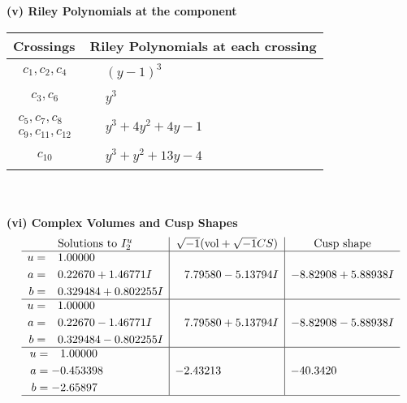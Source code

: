 \documentclass[1p]{elsarticle_modified}
\theoremstyle{definition}
\newcommand{\I}{\sqrt{-1}}
\begin{document}
\flushleft \textbf{(v) Riley Polynomials at the component}\newline \\
\begin{tabular}{m{50pt}|m{274pt}}
Crossings & \hspace{64pt}Riley Polynomials at each crossing \\
\hline $$\begin{aligned}c_{1},c_{2},c_{4}\end{aligned}$$&$\begin{aligned}
&(y-1)^3
\end{aligned}$\\
\hline $$\begin{aligned}c_{3},c_{6}\end{aligned}$$&$\begin{aligned}
&y^3
\end{aligned}$\\
\hline $$\begin{aligned}c_{5},c_{7},c_{8}\\c_{9},c_{11},c_{12}\end{aligned}$$&$\begin{aligned}
&y^3+4 y^2+4 y-1
\end{aligned}$\\
\hline $$\begin{aligned}c_{10}\end{aligned}$$&$\begin{aligned}
&y^3+y^2+13 y-4
\end{aligned}$\\
\hline
\end{tabular}\\~\\
\newpage\flushleft \textbf{(vi) Complex Volumes and Cusp Shapes}
$$\begin{array}{c|c|c}  
\text{Solutions to }I^u_{2}& \I (\text{vol} + \sqrt{-1}CS) & \text{Cusp shape}\\
 \hline 
\begin{aligned}
u &= \phantom{-}1.00000\phantom{ +0.000000I} \\
a &= \phantom{-}0.22670 + 1.46771 I \\
b &= \phantom{-}0.329484 + 0.802255 I\end{aligned}
 & \phantom{-}7.79580 - 5.13794 I & -8.82908 + 5.88938 I \\ \hline\begin{aligned}
u &= \phantom{-}1.00000\phantom{ +0.000000I} \\
a &= \phantom{-}0.22670 - 1.46771 I \\
b &= \phantom{-}0.329484 - 0.802255 I\end{aligned}
 & \phantom{-}7.79580 + 5.13794 I & -8.82908 - 5.88938 I \\ \hline\begin{aligned}
u &= \phantom{-}1.00000\phantom{ +0.000000I} \\
a &= -0.453398\phantom{ +0.000000I} \\
b &= -2.65897\phantom{ +0.000000I}\end{aligned}
 & -2.43213\phantom{ +0.000000I} & -40.3420\phantom{ +0.000000I}\\
 \hline 
 \end{array}$$\newpage\newpage\renewcommand{\arraystretch}{1}
\end{document}
